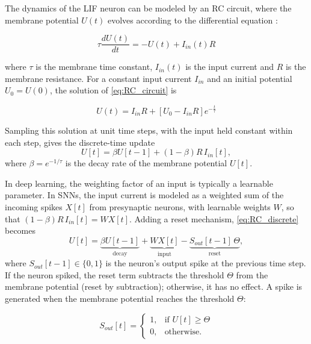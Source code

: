     The dynamics of the LIF neuron can be modeled by an RC circuit, where the membrane potential $U(t)$ evolves according to the differential equation \cite{eshraghianTrainingSpikingNeural2023}:

    \begin{equation}
        \tau \frac{dU(t)}{dt} = -U(t) + I_{in}(t)R
        \label{eq:RC_circuit}
    \end{equation}

    where $\tau$ is the membrane time constant, $I_{in}(t)$ is the input current and $R$ is the membrane resistance. For a constant input current $I_{in}$ and an initial potential $U_0 = U(0)$, the solution of \eqref{eq:RC_circuit} is

    \begin{equation}
        U(t) = I_{in}R + [U_0 - I_{in}R]e^{-\frac{t}{\tau}}
        \label{eq:RC_solution}
    \end{equation}

    Sampling this solution at unit time steps, with the input held constant within each step, gives the discrete-time update
    \begin{equation}
        U[t] = \beta U[t-1] + (1 - \beta) R\, I_{in}[t],
        \label{eq:RC_discrete}
    \end{equation}
    where $\beta = e^{-1/\tau}$ is the decay rate of the membrane potential $U[t]$.

    In deep learning, the weighting factor of an input is typically a learnable parameter. In SNNs, the input current is modeled as a weighted sum of the incoming spikes $X[t]$ from presynaptic neurons, with learnable weights $W$, so that $(1-\beta)R\,I_{in}[t] = W X[t]$. Adding a reset mechanism, \eqref{eq:RC_discrete} becomes
    \begin{equation}
        U[t] = \underbrace{\beta U[t-1]}_{\text{decay}} + \underbrace{W X[t]}_{\text{input}} - \underbrace{S_{out}[t-1]\,\Theta}_{\text{reset}},
        \label{eq:membrane_potential}
    \end{equation}
    where $S_{out}[t-1] \in \{0,1\}$ is the neuron's output spike at the previous time step. If the neuron spiked, the reset term subtracts the threshold $\Theta$ from the membrane potential (reset by subtraction); otherwise, it has no effect. A spike is generated when the membrane potential reaches the threshold $\Theta$:

    \begin{equation}
        S_{out}[t] =
        \begin{cases}
            1, & \text{if } U[t] \geq \Theta \\
            0, & \text{otherwise.}
        \end{cases}
        \label{eq:spike_generation}
    \end{equation}


